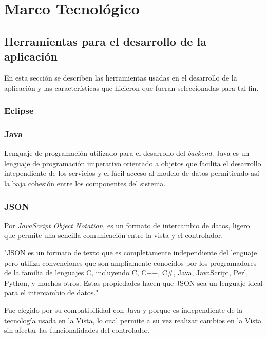 \chapter{Marco Tecnológico}

    \section{Herramientas para el desarrollo de la aplicación}
    
    En esta sección se describen las herramientas usadas en el desarrollo de la aplicación y las características que hicieron que fueran seleccionadas para tal fin.
    
        \subsection{Eclipse}
    
        \subsection{Java}
        
        Lenguaje de programación utilizado para el desarrollo del \textit{backend}. Java es un lenguaje de programación imperativo orientado a objetos que facilita el desarrollo intependiente de los servicios y el fácil acceso al modelo de datos permitiendo así la baja cohesión entre los componentes del sistema.
        
        \subsection{JSON}
        
        Por \textit{JavaScript Object Notation}, es un formato de intercambio de datos, ligero\cite{JSON-yahoo} que permite una sencilla comunicación entre la vista y el controlador.
        
        "JSON es un formato de texto que es completamente independiente del lenguaje pero utiliza convenciones que son ampliamente conocidos por los programadores de la familia de lenguajes C, incluyendo C, C++, C\#, Java, JavaScript, Perl, Python, y muchos otros. Estas propiedades hacen que JSON sea un lenguaje ideal para el intercambio de datos\cite{JSON-jsonOrg}."
        
        Fue elegido por su compatibilidad con Java y porque es independiente de la tecnología usada en la Vista, lo cual permite a su vez realizar cambios en la Vista sin afectar las funcionalidades del controlador.
        
